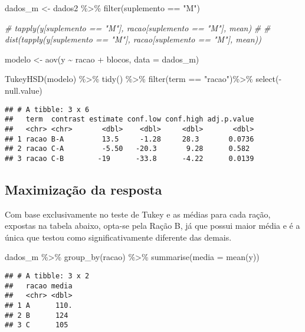 \documentclass[
]{article}
\newenvironment{Shaded}{\begin{snugshade}}{\end{snugshade}}
\newcommand{\AttributeTok}[1]{\textcolor[rgb]{0.77,0.63,0.00}{#1}}
\newcommand{\CommentTok}[1]{\textcolor[rgb]{0.56,0.35,0.01}{\textit{#1}}}
\newcommand{\FunctionTok}[1]{\textcolor[rgb]{0.00,0.00,0.00}{#1}}
\newcommand{\NormalTok}[1]{#1}
\newcommand{\OtherTok}[1]{\textcolor[rgb]{0.56,0.35,0.01}{#1}}
\newcommand{\SpecialCharTok}[1]{\textcolor[rgb]{0.00,0.00,0.00}{#1}}
\newcommand{\StringTok}[1]{\textcolor[rgb]{0.31,0.60,0.02}{#1}}
\begin{document}
\begin{Shaded}
\begin{Highlighting}[]
\NormalTok{dados\_m }\OtherTok{\textless{}{-}}\NormalTok{ dados2 }\SpecialCharTok{\%\textgreater{}\%} \FunctionTok{filter}\NormalTok{(suplemento }\SpecialCharTok{==} \StringTok{"M"}\NormalTok{)}

\CommentTok{\# tapply(y[suplemento == "M"], racao[suplemento == "M"], mean)}
\CommentTok{\# }
\CommentTok{\# dist(tapply(y[suplemento == "M"], racao[suplemento == "M"], mean))}

\NormalTok{modelo }\OtherTok{\textless{}{-}} \FunctionTok{aov}\NormalTok{(y }\SpecialCharTok{\textasciitilde{}}\NormalTok{ racao }\SpecialCharTok{+}\NormalTok{ blocos, }\AttributeTok{data =}\NormalTok{ dados\_m)}

\FunctionTok{TukeyHSD}\NormalTok{(modelo) }\SpecialCharTok{\%\textgreater{}\%} \FunctionTok{tidy}\NormalTok{() }\SpecialCharTok{\%\textgreater{}\%}
  \FunctionTok{filter}\NormalTok{(term }\SpecialCharTok{==} \StringTok{"racao"}\NormalTok{)}\SpecialCharTok{\%\textgreater{}\%}
  \FunctionTok{select}\NormalTok{(}\SpecialCharTok{{-}}\StringTok{\textasciigrave{}}\AttributeTok{null.value}\StringTok{\textasciigrave{}}\NormalTok{)}
\end{Highlighting}
\end{Shaded}

\begin{verbatim}
## # A tibble: 3 x 6
##   term  contrast estimate conf.low conf.high adj.p.value
##   <chr> <chr>       <dbl>    <dbl>     <dbl>       <dbl>
## 1 racao B-A         13.5     -1.28     28.3       0.0736
## 2 racao C-A         -5.50   -20.3       9.28      0.582 
## 3 racao C-B        -19      -33.8      -4.22      0.0139
\end{verbatim}

\hypertarget{maximizauxe7uxe3o-da-resposta}{%
\subsection{Maximização da
resposta}\label{maximizauxe7uxe3o-da-resposta}}

Com base exclusivamente no teste de Tukey e as médias para cada ração,
expostas na tabela abaixo, opta-se pela Ração B, já que possui maior
média e é a única que testou como significativamente diferente das
demais.

\begin{Shaded}
\begin{Highlighting}[]
\NormalTok{dados\_m }\SpecialCharTok{\%\textgreater{}\%} \FunctionTok{group\_by}\NormalTok{(racao) }\SpecialCharTok{\%\textgreater{}\%} \FunctionTok{summarise}\NormalTok{(}\AttributeTok{media =} \FunctionTok{mean}\NormalTok{(y))}
\end{Highlighting}
\end{Shaded}

\begin{verbatim}
## # A tibble: 3 x 2
##   racao media
##   <chr> <dbl>
## 1 A      110.
## 2 B      124 
## 3 C      105
\end{verbatim}
\end{document}
